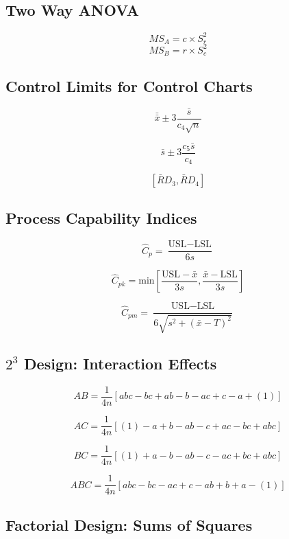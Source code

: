 \documentclass[a4paper,12pt]{article}
\begin{document}
\subsection*{Two Way ANOVA}
\[MS_A = c \times S^2_r\]
\[MS_B = r \times S^2_c\]

\subsection*{Control Limits for Control Charts}

\[ \bar{\bar{x}} \pm 3\frac{\bar{s}}{c_4\sqrt{n}}\]

\[ \bar{s} \pm 3\frac{c_5\bar{s}}{c_4}\]

\[\left[ \bar{R}D_3, \bar{R}D_4\right]\]

\subsection*{Process Capability Indices}
\[ \hat{C}_p = \frac{\mbox{USL} - \mbox{LSL}}{6s}\]

\[ \hat{C}_{pk} = \mbox{min} \left[\frac{\mbox{USL} - \bar{x}}{3s},\frac{\bar{x} - \mbox{LSL}}{3s} \right] \]

\[ \hat{C}_{pm} = \frac{\mbox{USL} - \mbox{LSL}}{6\sqrt{s^2+(\bar{x}-T)^2}}\]
\bigskip
%
\subsection*{$2^3$ Design: Interaction Effects}

\[ AB = \frac{1}{4n} \left[ abc - bc + ab - b - ac + c - a + (1) \right] \]

\[ AC = \frac{1}{4n} \left[ (1) - a + b - ab -c + ac - bc + abc \right] \]

\[ BC = \frac{1}{4n} \left[ (1) + a - b - ab - c - ac + bc + abc \right] \]

\[ABC = \frac{1}{4n} \left[ abc - bc - ac + c - ab + b +  a - (1) \right] \]

\bigskip

\subsection*{Factorial Design: Sums of Squares}
\end{document}
